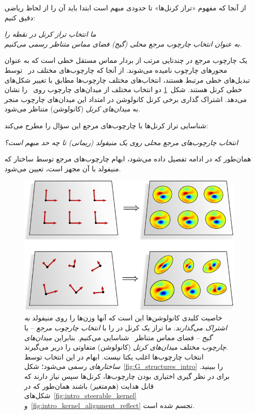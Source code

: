 از آنجا که مفهوم «تراز کرنل‌ها» تا حدودی مبهم است
ابتدا باید آن را از لحاظ ریاضی دقیق کنیم:

\begin{minipage}{\textwidth}
	\begin{center}\it
		ما انتخاب تراز کرنل در نقطه  را \\
		به عنوان انتخاب چارچوب مرجع محلی (گیج)
		فضای مماس متناظر \lr{$\TpM$} رسمی می‌کنیم.
	\end{center}
\end{minipage}

یک چارچوب مرجع در  چندتایی مرتب \lr{$[e_1,\, \dots,\, e_d]$} از  بردار مماس مستقل خطی  است که به عنوان محورهای چارچوب نامیده می‌شوند.
از آنجا که چارچوب‌های مختلف در~ توسط تبدیل‌های خطی مرتبط هستند، انتخاب‌های مختلف چارچوب‌ها مطابق با تغییر شکل‌های خطی کرنل هستند.
شکل~\ref{fig:intro_kernel_alignment_trivial} دو انتخاب مختلف از میدان‌های چارچوب روی~ را نشان می‌دهد.
اشتراک گذاری برخی کرنل کانولوشن در امتداد این میدان‌های چارچوب منجر به \emph{میدان‌های کرنل} (کانولوشن) متناظر می‌شود.


شناسایی تراز کرنل‌ها با چارچوب‌های مرجع این سؤال را مطرح می‌کند:
\begin{center}\it
	انتخاب چارچوب‌های مرجع محلی روی یک منیفولد (ریمانی) تا چه حد مبهم است؟
\end{center}
همان‌طور که در ادامه تفصیل داده می‌شود، ابهام چارچوب‌های مرجع توسط ساختار  که منیفولد با آن مجهز است، تعیین می‌شود.


\begin{figure}
	\centering
	\includegraphics[width=.62\textwidth]{figures/intro_kernel_alignment_trivial.pdf}
	\captionsetup{width=.9\textwidth}
	\caption{\small
		خاصیت کلیدی کانولوشن‌ها این است که آنها وزن‌ها را روی منیفولد \emph{به اشتراک می‌گذارند}.
		ما تراز یک کرنل در  را با \emph{انتخاب چارچوب مرجع} -- یا \emph{گیج} -- فضای مماس متناظر~\lr{$\TpM$} شناسایی می‌کنیم.
		بنابراین \emph{میدان‌های چارچوب} مختلف \emph{میدان‌های کرنل} (کانولوشن) متفاوتی را دربر می‌گیرند.
		\\[1ex]
		انتخاب چارچوب‌ها اغلب یکتا نیست.
		ابهام در این انتخاب توسط \emph{ساختارهای}  رسمی می‌شود؛ شکل~\ref{fig:G_structures_intro} را ببینید.
		برای در نظر گیری اختیاری بودن چارچوب‌ها، کرنل‌ها سپس نیاز دارند که قابل هدایت  (هم‌متغیر) باشند همان‌طور که در شکل‌های~\ref{fig:intro_steerable_kernel} و~\ref{fig:intro_kernel_alignment_reflect} تجسم شده است.
		\\[0pt]
	}
	\label{fig:intro_kernel_alignment_trivial}
\end{figure}





